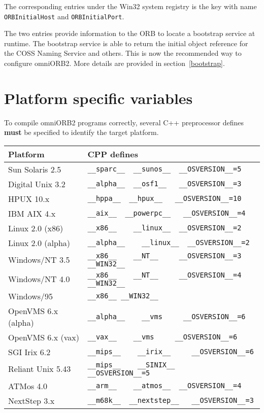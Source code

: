 \documentclass[11pt,twoside,onecolumn]{book}
\begin{document}
The corresponding entries under the Win32 system registry is the key with
name {\tt ORBInitialHost} and {\tt ORBInitialPort}.

The two entries provide information to the ORB to locate a bootstrap
service at runtime. The bootstrap service is able to return the initial
object reference for the COSS Naming Service and others. This is now the
recommended way to configure omniORB2. More details are provided in
section~\ref{bootstrap}.



\section{Platform specific variables}

To compile omniORB2 programs correctly, several C++ preprocessor defines
{\bf must} be specified to identify the target platform.

\begin{flushleft}
\begin{tabular}{|l|l|}
\hline
Platform & CPP defines \\
\hline
Sun Solaris 2.5  & \verb|__sparc__  __sunos__  __OSVERSION__=5| \\
\hline
Digital Unix 3.2 & \verb|__alpha__  __osf1__   __OSVERSION__=3| \\
\hline
HPUX 10.x & \verb|__hppa__  __hpux__   __OSVERSION__=10| \\
\hline
IBM AIX 4.x & \verb|__aix__  __powerpc__   __OSVERSION__=4| \\
\hline
Linux 2.0 (x86)  & \verb|__x86__    __linux__  __OSVERSION__=2| \\
\hline
Linux 2.0 (alpha)  & \verb|__alpha__    __linux__  __OSVERSION__=2| \\
\hline
Windows/NT 3.5   & \verb|__x86__    __NT__     __OSVERSION__=3  __WIN32__| \\
\hline
Windows/NT 4.0   & \verb|__x86__    __NT__     __OSVERSION__=4  __WIN32__| \\
\hline
Windows/95   & \verb|__x86__ __WIN32__| \\
\hline
OpenVMS 6.x (alpha) & \verb|__alpha__    __vms     __OSVERSION__=6 | \\
\hline
OpenVMS 6.x (vax)   & \verb|__vax__    __vms     __OSVERSION__=6 | \\
\hline
SGI Irix 6.2 & \verb|__mips__    __irix__     __OSVERSION__=6 | \\
\hline
Reliant Unix 5.43 & \verb|__mips__    __SINIX__     __OSVERSION__=5 | \\
\hline
ATMos 4.0        & \verb|__arm__    __atmos__  __OSVERSION__=4| \\
\hline
NextStep 3.x & \verb|__m68k__  __nextstep__   __OSVERSION__=3| \\
\hline
\end{tabular}
\end{flushleft}
\end{document}
